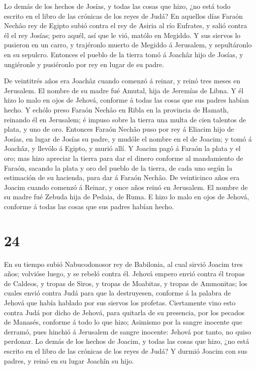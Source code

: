  Lo demás de los hechos de Josías, y todas las cosas que
hizo, ¿no está todo escrito en el libro de las crónicas de los reyes de
Judá?  En aquellos días Faraón Nechâo rey de Egipto subió
contra el rey de Asiria al río Eufrates, y salió contra él el rey
Josías; pero aquél, así que le vió, matólo en Megiddo.  Y
sus siervos lo pusieron en un carro, y trajéronlo muerto de Megiddo á
Jerusalem, y sepultáronlo en su sepulcro. Entonces el pueblo de la
tierra tomó á Joachâz hijo de Josías, y ungiéronle y pusiéronlo por rey
en lugar de su padre.

 De veintitrés años era Joachâz cuando comenzó á reinar, y
reinó tres meses en Jerusalem. El nombre de su madre fué Amutal, hija de
Jeremías de Libna.  Y él hizo lo malo en ojos de Jehová,
conforme á todas las cosas que sus padres habían hecho.  Y
echólo preso Faraón Nechâo en Ribla en la provincia de Hamath, reinando
él en Jerusalem; é impuso sobre la tierra una multa de cien talentos de
plata, y uno de oro.  Entonces Faraón Nechâo puso por rey á
Eliacim hijo de Josías, en lugar de Josías su padre, y mudóle el nombre
en el de Joacim; y tomó á Joachâz, y llevólo á Egipto, y murió allí.
 Y Joacim pagó á Faraón la plata y el oro; mas hizo
apreciar la tierra para dar el dinero conforme al mandamiento de Faraón,
sacando la plata y oro del pueblo de la tierra, de cada uno según la
estimación de su hacienda, para dar á Faraón Nechâo.  De
veinticinco años era Joacim cuando comenzó á Reinar, y once años reinó
en Jerusalem. El nombre de su madre fué Zebuda hija de Pedaia, de Ruma.
 E hizo lo malo en ojos de Jehová, conforme á todas las
cosas que sus padres habían hecho.

\hypertarget{section-23}{%
\section{24}\label{section-23}}

 En su tiempo subió Nabucodonosor rey de Babilonia, al cual
sirvió Joacim tres años; volvióse luego, y se rebeló contra él.
 Jehová empero envió contra él tropas de Caldeos, y tropas
de Siros, y tropas de Moabitas, y tropas de Ammonitas; los cuales envió
contra Judá para que la destruyesen, conforme á la palabra de Jehová que
había hablado por sus siervos los profetas.  Ciertamente
vino esto contra Judá por dicho de Jehová, para quitarla de su
presencia, por los pecados de Manasés, conforme á todo lo que hizo;
 Asimismo por la sangre inocente que derramó, pues hinchió á
Jerusalem de sangre inocente: Jehová por tanto, no quiso perdonar.
 Lo demás de los hechos de Joacim, y todas las cosas que
hizo, ¿no está escrito en el libro de las crónicas de los reyes de Judá?
 Y durmió Joacim con sus padres, y reinó en su lugar Joachîn
su hijo.

